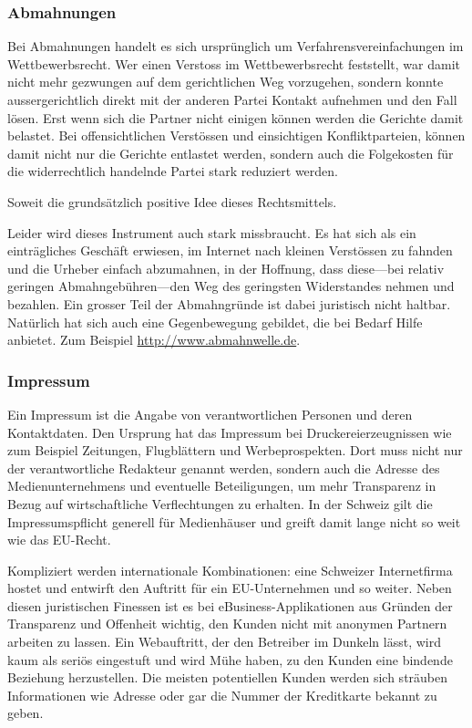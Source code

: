 \subsubsection*{Abmahnungen}

Bei Abmahnungen handelt es sich ursprünglich um Verfahrensvereinfachungen im
Wettbewerbsrecht. Wer einen Verstoss im Wettbewerbsrecht feststellt, war damit
nicht mehr gezwungen auf dem gerichtlichen Weg vorzugehen, sondern konnte
aussergerichtlich direkt mit der anderen Partei Kontakt aufnehmen und den
Fall lösen. Erst wenn sich die Partner nicht einigen können werden die
Gerichte damit belastet. Bei offensichtlichen Verstössen und einsichtigen
Konfliktparteien, können damit nicht nur die Gerichte entlastet werden, sondern
auch die Folgekosten für die widerrechtlich handelnde Partei stark reduziert
werden.

Soweit die grundsätzlich positive Idee dieses Rechtsmittels.

Leider wird dieses Instrument auch stark missbraucht. Es hat sich als ein
einträgliches Geschäft erwiesen, im Internet nach kleinen Verstössen zu
fahnden und die Urheber einfach abzumahnen, in der Hoffnung, dass diese---bei
relativ geringen Abmahngebühren---den Weg des geringsten Widerstandes nehmen
und bezahlen. Ein grosser Teil der Abmahngründe ist dabei juristisch nicht
haltbar. Natürlich hat sich auch eine Gegenbewegung gebildet, die bei Bedarf
Hilfe anbietet. Zum Beispiel \href{http://www.abmahnwelle.de}{http://www.abmahnwelle.de}.

\subsubsection*{Impressum}

Ein Impressum ist die Angabe von verantwortlichen Personen und deren Kontaktdaten.
Den Ursprung hat das Impressum bei Druckereierzeugnissen wie zum Beispiel
Zeitungen, Flugblättern und Werbeprospekten. Dort muss nicht nur der verantwortliche
Redakteur genannt werden, sondern auch die Adresse des Medienunternehmens und
eventuelle Beteiligungen, um mehr Transparenz in Bezug auf wirtschaftliche
Verflechtungen zu erhalten. In der Schweiz gilt die Impressumspflicht generell
für Medienhäuser und greift damit lange nicht so weit wie das EU-Recht.

Kompliziert werden internationale Kombinationen: eine Schweizer Internetfirma
hostet und entwirft den Auftritt für ein EU-Unternehmen und so weiter.
Neben diesen juristischen Finessen ist es bei eBusiness-Applikationen aus
Gründen der Transparenz und Offenheit wichtig, den Kunden nicht mit anonymen
Partnern arbeiten zu lassen. Ein Webauftritt, der den Betreiber im Dunkeln
lässt, wird kaum als seriös eingestuft und wird Mühe haben, zu den Kunden
eine bindende Beziehung herzustellen. Die meisten potentiellen Kunden werden
sich sträuben Informationen wie Adresse oder gar die Nummer der Kreditkarte
bekannt zu geben.

